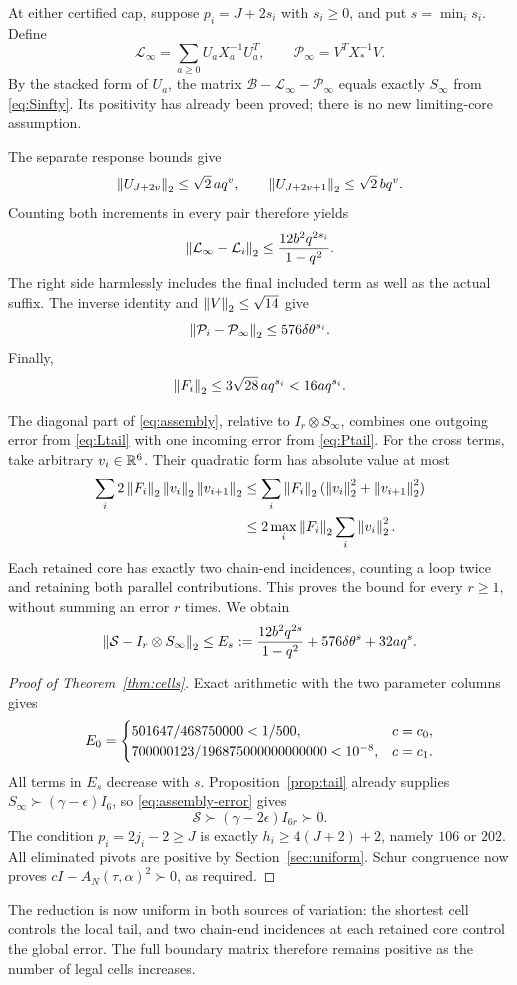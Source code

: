 At either certified cap, suppose $p_i=J+2s_i$ with $s_i\ge0$, and put
$s=\min_i s_i$. Define
\[
 \mathcal L_\infty=\sum_{a\ge0}U_aX_a^{-1}U_a^T,
 \qquad \mathcal P_\infty=V^TX_*^{-1}V.
\]
By the stacked form of $U_a$, the matrix
$\mathcal B-\mathcal L_\infty-\mathcal P_\infty$ equals exactly
$S_\infty$ from \eqref{eq:Sinfty}. Its positivity has already been
proved; there is no new limiting-core assumption.

The separate response bounds give
\[
 \left\lVert U_{J+2v}\right\rVert_2\le\sqrt2\,a q^v,
 \qquad \left\lVert U_{J+2v+1}\right\rVert_2\le\sqrt2\,b q^v.
\]
Counting both increments in every pair therefore yields
\begin{equation}
 \left\lVert\mathcal L_\infty-\mathcal L_i\right\rVert_2
 \le\frac{12b^2q^{2s_i}}{1-q^2}.
 \label{eq:Ltail}
\end{equation}
The right side harmlessly includes the final included term as well as
the actual suffix. The inverse identity and $\left\lVert V\right\rVert_2\le\sqrt{14}$
give
\begin{equation}
 \left\lVert\mathcal P_i-\mathcal P_\infty\right\rVert_2
 \le576\delta\theta^{s_i}.
 \label{eq:Ptail}
\end{equation}
Finally,
\begin{equation}
 \left\lVert F_i\right\rVert_2\le3\sqrt{28}\,a q^{s_i}<16a q^{s_i}.
 \label{eq:Ftail}
\end{equation}

The diagonal part of \eqref{eq:assembly}, relative to
$I_r\otimes S_\infty$, combines one outgoing error from
\eqref{eq:Ltail} with one incoming error from \eqref{eq:Ptail}.
For the cross terms, take arbitrary $v_i\in\mathbb R^6$. Their quadratic form
has absolute value at most
\begin{align*}
 \sum_i2\left\lVert F_i\right\rVert_2\left\lVert v_i\right\rVert_2\left\lVert v_{i+1}\right\rVert_2
 &\le\sum_i\left\lVert F_i\right\rVert_2(\left\lVert v_i\right\rVert_2^2+\left\lVert v_{i+1}\right\rVert_2^2)\\
 &\le2\max_i\left\lVert F_i\right\rVert_2\sum_i\left\lVert v_i\right\rVert_2^2.
\end{align*}
Each retained core has exactly two chain-end incidences, counting a loop
twice and retaining both parallel contributions. This proves the bound
for every $r\ge1$, without summing an error $r$ times. We obtain
\begin{equation}
 \left\lVert\mathcal S-I_r\otimes S_\infty\right\rVert_2
 \le E_s:=\frac{12b^2q^{2s}}{1-q^2}
              +576\delta\theta^s+32a q^s.
 \label{eq:assembly-error}
\end{equation}

\begin{proof}[Proof of Theorem~\ref{thm:cells}]
Exact arithmetic with the two parameter columns gives
\[
 E_0=
 \begin{cases}
 501647/468750000<1/500,&c=c_0,\\
 700000123/196875000000000000<10^{-8},&c=c_1.
 \end{cases}
\]
All terms in $E_s$ decrease with $s$. Proposition~\ref{prop:tail} already
supplies $S_\infty\succ(\gamma-\epsilon)I_6$, so
\eqref{eq:assembly-error} gives
\[
 \mathcal S\succ(\gamma-2\epsilon)I_{6r}\succ0.
\]
The condition $p_i=2j_i-2\ge J$ is exactly
$h_i\ge4(J+2)+2$, namely $106$ or $202$. All eliminated pivots are
positive by Section~\ref{sec:uniform}. Schur congruence now proves
$cI-A_N(\tau,\alpha)^2\succ0$, as required.
\end{proof}

The reduction is now uniform in both sources of variation: the shortest
cell controls the local tail, and two chain-end incidences at each retained
core control the global error. The full boundary matrix therefore remains
positive as the number of legal cells increases.
